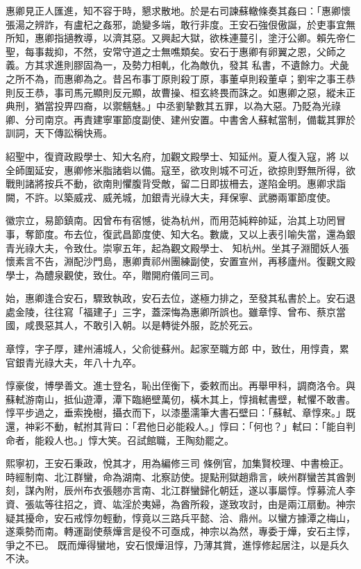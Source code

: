 \begin{pinyinscope}
 惠卿見正人匯進，知不容于時，懇求散地。於是右司諫蘇轍條奏其姦曰：「惠卿懷張湯之辨詐，有盧杞之姦邪，詭變多端，敢行非度。王安石強佷傲誕，於吏事宜無所知，惠卿指擿教導，以濟其惡。又興起大獄，欲株連蔓引，塗汙公卿。賴先帝仁聖，每事裁抑，不然，安常守道之士無噍類矣。安石于惠卿有卵翼之恩，父師之義。方其求進則膠固為一，及勢力相軋，化為敵仇，發其
 私書，不遺餘力。犬彘之所不為，而惠卿為之。昔呂布事丁原則殺丁原，事董卓則殺董卓；劉牢之事王恭則反王恭，事司馬元顯則反元顯，故曹操、桓玄終畏而誅之。如惠卿之惡，縱未正典刑，猶當投畀四裔，以禦魑魅。」中丞劉摯數其五罪，以為大惡。乃貶為光祿卿、分司南京。再責建寧軍節度副使、建州安置。中書舍人蘇軾當制，備載其罪於訓詞，天下傳訟稱快焉。



 紹聖中，復資政殿學士、知大名府，加觀文殿學士、知延州。夏人復入寇，將
 以全師圍延安，惠卿修米脂諸砦以備。寇至，欲攻則城不可近，欲掠則野無所得，欲戰則諸將按兵不動，欲南則懼腹背受敵，留二日即拔柵去，遂陷金明。惠卿求詣闕，不許。以築威戎、威羌城，加銀青光祿大夫，拜保寧、武勝兩軍節度使。



 徽宗立，易節鎮南。因曾布有宿憾，徙為杭州，而用范純粹帥延，治其上功罔冒事，奪節度。布去位，復武昌節度使、知大名。數歲，又以上表引喻失當，還為銀青光祿大夫，令致仕。崇寧五年，起為觀文殿學士、
 知杭州。坐其子淵聞妖人張懷素言不告，淵配沙門島，惠卿責祁州團練副使，安置宣州，再移廬州。復觀文殿學士，為醴泉觀使，致仕。卒，贈開府儀同三司。



 始，惠卿逢合安石，驟致執政，安石去位，遂極力排之，至發其私書於上。安石退處金陵，往往寫「福建子」三字，蓋深悔為惠卿所誤也。雖章惇、曾布、蔡京當國，咸畏惡其人，不敢引入朝。以是轉徙外服，訖於死云。



 章惇，字子厚，建州浦城人，父俞徙蘇州。起家至職方郎
 中，致仕，用惇貴，累官銀青光祿大夫，年八十九卒。



 惇豪俊，博學善文。進士登名，恥出侄衡下，委敕而出。再舉甲科，調商洛令。與蘇軾游南山，抵仙遊潭，潭下臨絕壁萬仞，橫木其上，惇揖軾書壁，軾懼不敢書。惇平步過之，垂索挽樹，攝衣而下，以漆墨濡筆大書石壁曰：「蘇軾、章惇來。」既還，神彩不動，軾拊其背曰：「君他日必能殺人。」惇曰：「何也？」軾曰：「能自判命者，能殺人也。」惇大笑。召試館職，王陶劾罷之。



 熙寧初，王安石秉政，悅其才，用為編修三司
 條例官，加集賢校理、中書檢正。時經制南、北江群蠻，命為湖南、北察訪使。提點刑獄趙鼎言，峽州群蠻苦其酋剝刻，謀內附，辰州布衣張翹亦言南、北江群蠻歸化朝廷，遂以事屬惇。惇募流人李資、張竑等往招之，資、竑淫於夷婦，為酋所殺，遂致攻討，由是兩江扇動。神宗疑其擾命，安石戒惇勿輕動，惇竟以三路兵平懿、洽、鼎州。以蠻方據潭之梅山，遂乘勢而南。轉運副使蔡燁言是役不可亟成，神宗以為然，專委于燁，安石主惇，爭之不已。
 既而燁得蠻地，安石恨燁沮惇，乃薄其賞，進惇修起居注，以是兵久不決。




\end{pinyinscope}
